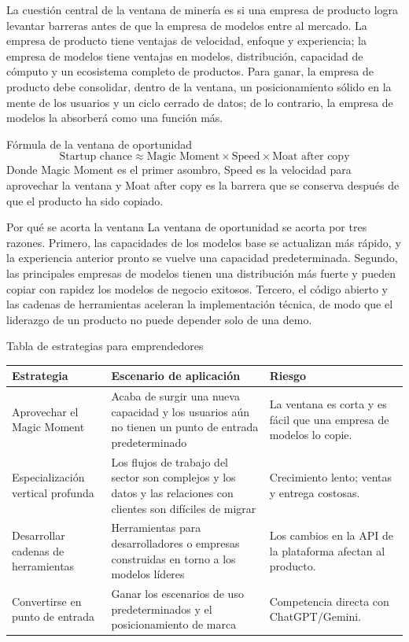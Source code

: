 \documentclass[a4paper]{article}
\begin{document}
La cuestión central de la ventana de minería es si una empresa de producto logra levantar barreras antes de que la empresa de modelos entre al mercado. La empresa de producto tiene ventajas de velocidad, enfoque y experiencia; la empresa de modelos tiene ventajas en modelos, distribución, capacidad de cómputo y un ecosistema completo de productos. Para ganar, la empresa de producto debe consolidar, dentro de la ventana, un posicionamiento sólido en la mente de los usuarios y un ciclo cerrado de datos; de lo contrario, la empresa de modelos la absorberá como una función más.

\begin{importantbox}{Fórmula de la ventana de oportunidad}
\[
\text{Startup chance} \approx \text{Magic Moment} \times \text{Speed} \times \text{Moat after copy}
\]
Donde Magic Moment es el primer asombro, Speed es la velocidad para aprovechar la ventana y Moat after copy es la barrera que se conserva después de que el producto ha sido copiado.
\end{importantbox}

\begin{knowledgebox}{Por qué se acorta la ventana}
La ventana de oportunidad se acorta por tres razones. Primero, las capacidades de los modelos base se actualizan más rápido, y la experiencia anterior pronto se vuelve una capacidad predeterminada. Segundo, las principales empresas de modelos tienen una distribución más fuerte y pueden copiar con rapidez los modelos de negocio exitosos. Tercero, el código abierto y las cadenas de herramientas aceleran la implementación técnica, de modo que el liderazgo de un producto no puede depender solo de una demo.
\end{knowledgebox}

\begin{knowledgebox}{Tabla de estrategias para emprendedores}
\begin{tabularx}{\textwidth}{p{}p{}X}
\toprule
Estrategia & Escenario de aplicación & Riesgo \\
\midrule
Aprovechar el Magic Moment & Acaba de surgir una nueva capacidad y los usuarios aún no tienen un punto de entrada predeterminado & La ventana es corta y es fácil que una empresa de modelos lo copie. \\
Especialización vertical profunda & Los flujos de trabajo del sector son complejos y los datos y las relaciones con clientes son difíciles de migrar & Crecimiento lento; ventas y entrega costosas. \\
Desarrollar cadenas de herramientas & Herramientas para desarrolladores o empresas construidas en torno a los modelos líderes & Los cambios en la API de la plataforma afectan al producto. \\
Convertirse en punto de entrada & Ganar los escenarios de uso predeterminados y el posicionamiento de marca & Competencia directa con ChatGPT/Gemini. \\
\bottomrule
\end{tabularx}
\end{knowledgebox}
\end{document}
